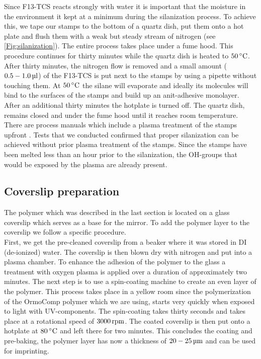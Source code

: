 Since F13-TCS reacts strongly with water it is important that the moisture in the environment it kept at a minimum during the silanization process. To achieve this, we tape our stamps to the bottom of a quartz dish, put them onto a hot plate and flush them with a weak but steady stream of nitrogen (see \autoref{Fig:silanization}). The entire process takes place under a fume hood. This procedure continues for thirty minutes while the quartz dish is heated to $50\degrees$.\\
After thirty minutes, the nitrogen flow is removed and a small amount ($0.5-1.0\ul$) of the F13-TCS is put next to the stamps by using a pipette without touching them. At $50\degrees$ the silane will evaporate and ideally its molecules will bind to the surfaces of the stamps and build up an anit-adhesive monolayer.\\
After an additional thirty minutes the hotplate is turned off. The quartz dish, remains closed and under the fume hood until it reaches room temperature.\\
There are process manuals which include a plasma treatment of the stamps upfront \cite{park2004anti}. Tests that 
we conducted confirmed that proper silanization can be achieved without prior plasma treatment of the stamps. Since the stamps have been melted less than an hour prior to the silanization, the OH-groups that would be exposed by the plasma are already present.

\subsection{Coverslip preparation}\label{ChapCoverslipPreparation}
The polymer which was described in the last section is located on a glass coverslip which serves as a base for the mirror. To add the polymer layer to the coverslip we follow a specific procedure.\\
First, we get the pre-cleaned coverslip from a beaker where it was stored in DI (de-ionized) water. The coverslip is then blown dry with nitrogen and put into a plasma chamber. To enhance the adhesion of the polymer to the glass a treatment with oxygen plasma is applied over a duration of approximately two minutes. The next step is to use a spin-coating machine to create an even layer of the polymer. This process takes place in a yellow room since the polymerization of the OrmoComp polymer which we are using, starts very quickly when exposed to light with UV-components. The spin-coating takes thirty seconds and takes place at a rotational speed of $3000\rpm$. The coated coverslip is then put onto a hotplate at $80\degrees$ and left there for two minutes. This concludes the coating and pre-baking, the polymer layer has now a thickness of $20-25\um$ and can be used for imprinting.

